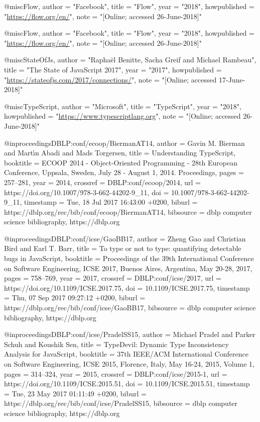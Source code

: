  @misc{Flow,
    author = "{Facebook}",
    title = "Flow",
    year = "2018",
    howpublished = "\url{https://flow.org/en/}",
    note = "[Online; accessed 26-June-2018]"
  } 
 
  @misc{Flow,
    author = "{Facebook}",
    title = "Flow",
    year = "2018",
    howpublished = "\url{https://flow.org/en/}",
    note = "[Online; accessed 26-June-2018]"
  }

@misc{StateOfJs,
    author = "{Raphaël Benitte, Sacha Greif and Michael Rambeau}",
    title = "The State of JavaScript 2017",
    year = "2017",
    howpublished = "\url{https://stateofjs.com/2017/connections/}",
    note = "[Online; accessed 17-June-2018]"
  }

  @misc{TypeScript,
    author = "{Microsoft}",
    title = "TypeScript",
    year = "2018",
    howpublished = "\url{https://www.typescriptlang.org}",
    note = "[Online; accessed 26-June-2018]"
  }


@inproceedings{DBLP:conf/ecoop/BiermanAT14,
  author    = {Gavin M. Bierman and
               Mart{\'{\i}}n Abadi and
               Mads Torgersen},
  title     = {Understanding TypeScript},
  booktitle = {{ECOOP} 2014 - Object-Oriented Programming - 28th European Conference,
               Uppsala, Sweden, July 28 - August 1, 2014. Proceedings},
  pages     = {257--281},
  year      = {2014},
  crossref  = {DBLP:conf/ecoop/2014},
  url       = {https://doi.org/10.1007/978-3-662-44202-9_11},
  doi       = {10.1007/978-3-662-44202-9_11},
  timestamp = {Tue, 18 Jul 2017 16:43:00 +0200},
  biburl    = {https://dblp.org/rec/bib/conf/ecoop/BiermanAT14},
  bibsource = {dblp computer science bibliography, https://dblp.org}
}

@inproceedings{DBLP:conf/icse/GaoBB17,
  author    = {Zheng Gao and
               Christian Bird and
               Earl T. Barr},
  title     = {To type or not to type: quantifying detectable bugs in JavaScript},
  booktitle = {Proceedings of the 39th International Conference on Software Engineering,
               {ICSE} 2017, Buenos Aires, Argentina, May 20-28, 2017},
  pages     = {758--769},
  year      = {2017},
  crossref  = {DBLP:conf/icse/2017},
  url       = {https://doi.org/10.1109/ICSE.2017.75},
  doi       = {10.1109/ICSE.2017.75},
  timestamp = {Thu, 07 Sep 2017 09:27:12 +0200},
  biburl    = {https://dblp.org/rec/bib/conf/icse/GaoBB17},
  bibsource = {dblp computer science bibliography, https://dblp.org}
}

@inproceedings{DBLP:conf/icse/PradelSS15,
  author    = {Michael Pradel and
               Parker Schuh and
               Koushik Sen},
  title     = {TypeDevil: Dynamic Type Inconsistency Analysis for JavaScript},
  booktitle = {37th {IEEE/ACM} International Conference on Software Engineering,
               {ICSE} 2015, Florence, Italy, May 16-24, 2015, Volume 1},
  pages     = {314--324},
  year      = {2015},
  crossref  = {DBLP:conf/icse/2015-1},
  url       = {https://doi.org/10.1109/ICSE.2015.51},
  doi       = {10.1109/ICSE.2015.51},
  timestamp = {Tue, 23 May 2017 01:11:49 +0200},
  biburl    = {https://dblp.org/rec/bib/conf/icse/PradelSS15},
  bibsource = {dblp computer science bibliography, https://dblp.org}
}


